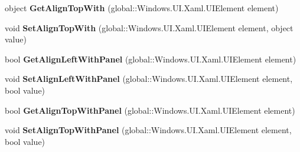 \begin{DoxyCompactItemize}
\mbox{\label{interface_windows_1_1_u_i_1_1_xaml_1_1_controls_1_1_i_relative_panel_statics_a86922d469c65c9e55a474d71a379dfd3}} 
object {\bfseries Get\+Align\+Top\+With} (global\+::\+Windows.\+U\+I.\+Xaml.\+U\+I\+Element element)
\item 
\mbox{\label{interface_windows_1_1_u_i_1_1_xaml_1_1_controls_1_1_i_relative_panel_statics_a247393a7e98c060d1eeef69d45b8ffcd}} 
void {\bfseries Set\+Align\+Top\+With} (global\+::\+Windows.\+U\+I.\+Xaml.\+U\+I\+Element element, object value)
\item 
\mbox{\label{interface_windows_1_1_u_i_1_1_xaml_1_1_controls_1_1_i_relative_panel_statics_a191f33699f05cc8d162583cad90ff2b1}} 
bool {\bfseries Get\+Align\+Left\+With\+Panel} (global\+::\+Windows.\+U\+I.\+Xaml.\+U\+I\+Element element)
\item 
\mbox{\label{interface_windows_1_1_u_i_1_1_xaml_1_1_controls_1_1_i_relative_panel_statics_ad6312a801d02ea8acb68387074ecb007}} 
void {\bfseries Set\+Align\+Left\+With\+Panel} (global\+::\+Windows.\+U\+I.\+Xaml.\+U\+I\+Element element, bool value)
\item 
\mbox{\label{interface_windows_1_1_u_i_1_1_xaml_1_1_controls_1_1_i_relative_panel_statics_a190b602dadc7feff901b6c1ab1906898}} 
bool {\bfseries Get\+Align\+Top\+With\+Panel} (global\+::\+Windows.\+U\+I.\+Xaml.\+U\+I\+Element element)
\item 
\mbox{\label{interface_windows_1_1_u_i_1_1_xaml_1_1_controls_1_1_i_relative_panel_statics_a7980252289e1bd42485241913f9afdad}} 
void {\bfseries Set\+Align\+Top\+With\+Panel} (global\+::\+Windows.\+U\+I.\+Xaml.\+U\+I\+Element element, bool value)
\item 
\mbox{\label{interface_windows_1_1_u_i_1_1_xaml_1_1_controls_1_1_i_relative_panel_statics_a61fabd1c8713c07b5ac48fa9a27f4ae5}} 

\end{DoxyCompactItemize}
